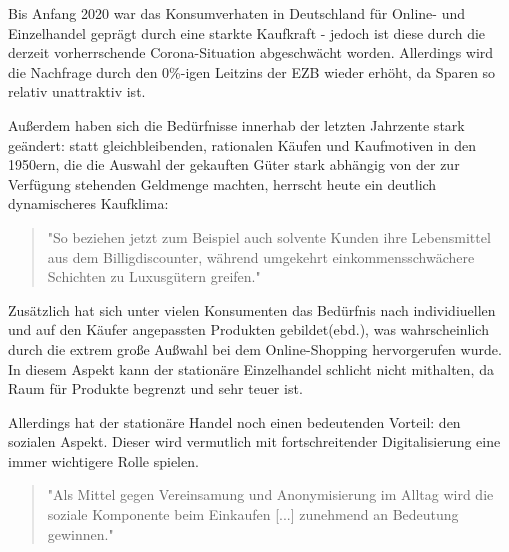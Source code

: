 \iffalse
Einteilung in: Online-Marktplätze + Online-Händler, Intermediäre, Kataloversender, stationäre Händler, Hersteller/Marken \cite{Graf}

entwicklung des kaufprozesses: graf:abbildung; 


änderung kaufablauf: \cite{Schaefers}
\fi



Bis Anfang 2020 war das Konsumverhaten in Deutschland für Online- und Einzelhandel geprägt durch eine starkte Kaufkraft - jedoch ist diese durch die derzeit vorherrschende Corona-Situation abgeschwächt worden\cite{BfWE}. Allerdings wird die Nachfrage durch den 0\%-igen Leitzins der \ac{EZB} wieder erhöht, da Sparen so relativ unattraktiv ist\cite[S. 49]{Ebert}.

Außerdem haben sich die Bedürfnisse innerhab der letzten Jahrzente stark geändert: statt gleichbleibenden, rationalen Käufen und Kaufmotiven in den 1950ern, die die Auswahl der gekauften Güter stark abhängig von der zur Verfügung stehenden Geldmenge machten\cite[S. 38]{Schramm}, herrscht heute ein deutlich dynamischeres Kaufklima:
\begin{quote}
"So beziehen jetzt zum Beispiel auch solvente Kunden ihre Lebensmittel aus dem Billigdiscounter, während  umgekehrt  einkommensschwächere  Schichten  zu  Luxusgütern  greifen."\cite[S. 43]{Nitt}
\end{quote}

Zusätzlich hat sich unter vielen Konsumenten das Bedürfnis nach individiuellen und auf den Käufer angepassten Produkten gebildet(ebd.), was wahrscheinlich durch die extrem große Außwahl bei dem Online-Shopping hervorgerufen wurde. In diesem Aspekt kann der stationäre Einzelhandel schlicht nicht mithalten, da Raum für Produkte begrenzt und sehr teuer ist.
\iffalse
Auch in anderen Aspekten ist der Onlinehandel stationären Geschäften überlegen

> billig - strategie vorallem von amazon und alibaba
\fi
Allerdings hat der stationäre Handel noch einen bedeutenden Vorteil: den sozialen Aspekt. Dieser wird vermutlich mit fortschreitender Digitalisierung eine immer wichtigere Rolle spielen\cite[S. 50]{Ebert}.
\begin{quote}
"Als Mittel gegen Vereinsamung und Anonymisierung im Alltag wird die soziale Komponente beim Einkaufen [...] zunehmend an Bedeutung gewinnen."\cite[S. 43]{Nitt}
\end{quote}
